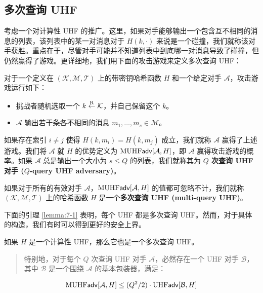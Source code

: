 \subsection{多次查询 UHF}\label{subsec:7-1-1}

考虑一个对计算性 UHF 的推广。这里，如果对手能够输出一个包含互不相同的消息的列表，该列表中的某一对消息对于 $H(k,\cdot)$ 来说是一个碰撞，我们就称该对手获胜。重点在于，尽管对手可能并不知道列表中到底哪一对消息导致了碰撞，但仍然赢得了游戏。更详细地，我们用下面的攻击游戏来定义多次查询 UHF：

\begin{game}\label{game:7-2}
对于一个定义在 $(\mathcal{K},\mathcal{M},\mathcal{T})$ 上的带密钥哈希函数 $H$ 和一个给定对手 $\mathcal{A}$，攻击游戏运行如下：
\begin{itemize}
	\item 挑战者随机选取一个 $k\overset{\rm R}\leftarrow\mathcal{K}$，并自己保留这个 $k$。
	\item $\mathcal{A}$ 输出若干条各不相同的消息 $m_1,\dots,m_s\in\mathcal{M}$。
\end{itemize}
如果存在索引 $i\neq j$ 使得 $H(k,m_i)=H(k,m_j)$ 成立，我们就称 $\mathcal{A}$ 赢得了上述游戏。我们将 $\mathcal{A}$ 就 $H$ 的优势定义为 ${\rm MUHF}\mathsf{adv}[\mathcal{A},H]$，即 $\mathcal{A}$ 赢得攻击游戏的概率。如果 $\mathcal{A}$ 总是输出一个大小为 $s\leq Q$ 的列表，我们就称其为 \textbf{$Q$ 次查询 UHF 对手 ($Q$-query UHF adversary)}。
\end{game}

\begin{definition}\label{def:7-3}
如果对于所有的有效对手 $\mathcal{A}$，${\rm MUHF}\mathsf{adv}[\mathcal{A},H]$ 的值都可忽略不计，我们就称 $(\mathcal{K},\mathcal{M},\mathcal{T})$ 上的哈希函数 $H$ 是一个\textbf{多次查询 UHF (multi-query UHF)}。
\end{definition}

下面的引理 \ref{lemma:7-1} 表明，每个 UHF 都是多次查询 UHF。然而，对于具体的构造，我们有时可以得到更好的安全上界。

\begin{lemma}\label{lemma:7-1}
如果 $H$ 是一个计算性 UHF，那么它也是一个多次查询 UHF。
\begin{quote}
特别地，对于每个 $Q$ 次查询 UHF 对手 $\mathcal{A}$，必然存在一个 UHF 对手 $\mathcal{B}$，其中 $\mathcal{B}$ 是一个围绕 $\mathcal{A}$ 的基本包装器，满足：
\end{quote}
\begin{equation}\label{eq:7-2}
{\rm MUHF}\mathsf{adv}[\mathcal{A},H]\leq{(Q^2/2)}\cdot{\rm UHF}\mathsf{adv}[\mathcal{B},H]
\end{equation}
\end{lemma}

